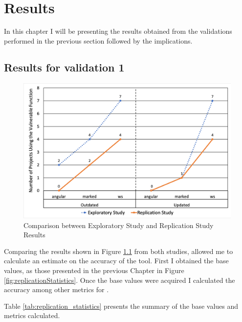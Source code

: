 \chapter{Results}
\label{sec:results}

In this chapter I will be presenting the results obtained from the validations performed in the previous section followed by the implications.

\section{Results for validation 1}
\begin{figure}[ht]
\centering
\includegraphics[width=1\textwidth]{images/studies_comp_graph3.png}
\caption{Comparison between Exploratory Study and Replication Study Results}
\label{fig:replicationResults}
\end{figure}
Comparing the results shown in Figure \ref{fig:replicationResults} from both studies, allowed me to calculate an estimate on the accuracy of the tool. First I obtained the base values, as those presented in the previous Chapter in Figure \ref{fig:replicationStatistics}. Once the base values were acquired I calculated the accuracy among other metrics for \tool[]. 

Table \ref{tab:replication_statistics} presents the summary of the base values and metrics calculated.

